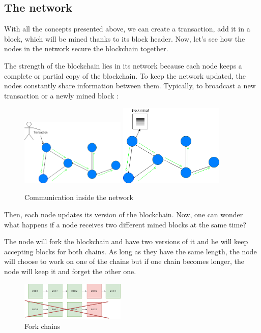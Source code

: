   \subsection{The network}

  With all the concepts presented above, we can create a transaction, add it in a block, which will be mined thanks to its block header. Now, let's see how the nodes in the network secure the blockchain together. \newline

  The strength of the blockchain lies in its network because each node keeps a complete or partial copy of the blockchain. To keep the network updated, the nodes constantly share information between them. Typically, to broadcast a new transaction or a newly mined block :

  \clearpage

  \begin{figure}[ht]
  \centering
  \includegraphics[width=5cm]{Figures/networkTransaction}
  \hspace{1cm}
  \includegraphics[width=5cm]{Figures/networkBlock}
  \caption{Communication inside the network}
  \end{figure}

  Then, each node updates its version of the blockchain. Now, one can wonder what happens if a node receives two different mined blocks at the same time?

  The node will fork the blockchain and have two versions of it and he will keep accepting blocks for both chains. As long as they have the same length, the node will choose to work on one of the chains but if one chain becomes longer, the node will keep it and forget the other one.

  \begin{figure}[ht]
  \centering
  \includegraphics[width=5cm]{Figures/forkChains}
  \caption{Fork chains}
  \end{figure}

